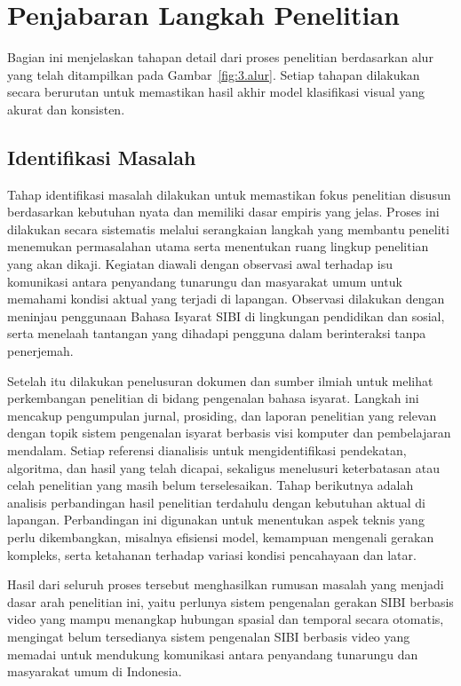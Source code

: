 \section{Penjabaran Langkah Penelitian} \label{III.Jabar_Alur}
Bagian ini menjelaskan tahapan detail dari proses penelitian berdasarkan alur yang telah ditampilkan pada Gambar~\ref{fig:3.alur}. Setiap tahapan dilakukan secara berurutan untuk memastikan hasil akhir model klasifikasi visual yang akurat dan konsisten.\par

\subsection{Identifikasi Masalah} \label{III.Identifikasi_Masalah}
Tahap identifikasi masalah dilakukan untuk memastikan fokus penelitian disusun berdasarkan kebutuhan nyata dan memiliki dasar empiris yang jelas. Proses ini dilakukan secara sistematis melalui serangkaian langkah yang membantu peneliti menemukan permasalahan utama serta menentukan ruang lingkup penelitian yang akan dikaji. Kegiatan diawali dengan observasi awal terhadap isu komunikasi antara penyandang tunarungu dan masyarakat umum untuk memahami kondisi aktual yang terjadi di lapangan. Observasi dilakukan dengan meninjau penggunaan Bahasa Isyarat SIBI di lingkungan pendidikan dan sosial, serta menelaah tantangan yang dihadapi pengguna dalam berinteraksi tanpa penerjemah.\par

Setelah itu dilakukan penelusuran dokumen dan sumber ilmiah untuk melihat perkembangan penelitian di bidang pengenalan bahasa isyarat. Langkah ini mencakup pengumpulan jurnal, prosiding, dan laporan penelitian yang relevan dengan topik sistem pengenalan isyarat berbasis visi komputer dan pembelajaran mendalam. Setiap referensi dianalisis untuk mengidentifikasi pendekatan, algoritma, dan hasil yang telah dicapai, sekaligus menelusuri keterbatasan atau celah penelitian yang masih belum terselesaikan. Tahap berikutnya adalah analisis perbandingan hasil penelitian terdahulu dengan kebutuhan aktual di lapangan. Perbandingan ini digunakan untuk menentukan aspek teknis yang perlu dikembangkan, misalnya efisiensi model, kemampuan mengenali gerakan kompleks, serta ketahanan terhadap variasi kondisi pencahayaan dan latar.\par

Hasil dari seluruh proses tersebut menghasilkan rumusan masalah yang menjadi dasar arah penelitian ini, yaitu perlunya sistem pengenalan gerakan SIBI berbasis video yang mampu menangkap hubungan spasial dan temporal secara otomatis, mengingat belum tersedianya sistem pengenalan SIBI berbasis video yang memadai untuk mendukung komunikasi antara penyandang tunarungu dan masyarakat umum di Indonesia.\par

